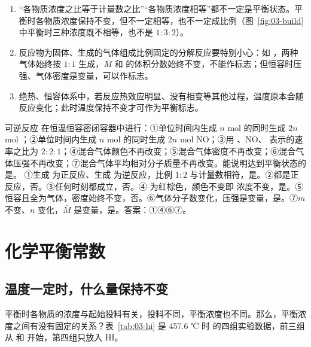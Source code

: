 \begin{yicuo}
\begin{enumerate}
\item “各物质浓度之比等于计量数之比”“各物质浓度相等”都不一定是平衡状态。平衡时各物质浓度保持不变，但不一定相等，也不一定成比例（图~\ref{fig:03-build} 中平衡时三种浓度既不相等，也不是 $1:3:2$）。
\item 反应物为固体、生成的气体组成比例固定的分解反应要特别小心：如 ，两种气体始终按 $1:1$ 生成，$\bar M$ 和  的体积分数始终不变，不能作标志；但恒容时压强、气体密度是变量，可以作标志。
\item 绝热、恒容体系中，若反应热效应明显、没有相变等其他过程，温度原本会随反应变化；此时温度保持不变才可作为平衡标志。
\end{enumerate}
\end{yicuo}

\begin{liti}[平衡标志综合判断]
可逆反应  在恒温恒容密闭容器中进行：①单位时间内生成 $n$ mol  的同时生成 $2n$ mol ；②单位时间内生成 $n$ mol  的同时生成 $2n$ mol NO；③用 、NO、 表示的速率之比为 $2:2:1$；④混合气体颜色不再改变；⑤混合气体密度不再改变；⑥混合气体压强不再改变；⑦混合气体平均相对分子质量不再改变。能说明达到平衡状态的是\tk。
\tcblower
\jie ①生成  为正反应、生成  为逆反应，比例 $1:2$ 与计量数相符，是。②都是正反应，否。③任何时刻都成立，否。④ 为红棕色，颜色不变即  浓度不变，是。⑤恒容且全为气体，密度始终不变，否。⑥气体分子数变化，压强是变量，是。⑦$m$ 不变、$n$ 变化，$\bar M$ 是变量，是。答案：①④⑥⑦。
\end{liti}

\section{化学平衡常数}

\subsection{温度一定时，什么量保持不变}
平衡时各物质的浓度与起始投料有关，投料不同，平衡浓度也不同。那么，平衡浓度之间有没有固定的关系？表~\ref{tab:03-hi} 是 457.6 ℃ 时  的四组实验数据，前三组从  和  开始，第四组只放入 HI。

